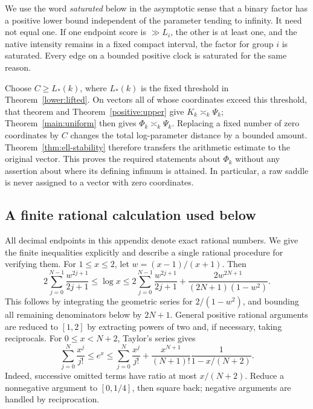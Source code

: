 We use the word \emph{saturated} below in the asymptotic sense that a
binary factor has a positive lower bound independent of the parameter
tending to infinity.  It need not equal one.  If one endpoint score is
\(\gg L_i\), the other is at least one, and the native intensity remains
in a fixed compact interval, the factor for group \(i\) is saturated.
Every edge on a bounded positive clock is saturated for the same reason.

Choose \(C\ge L_*(k)\), where \(L_*(k)\) is the fixed threshold in
Theorem~\ref{lower:lifted}.  On vectors all of whose coordinates exceed
this threshold, that theorem and Theorem~\ref{positive:upper} give
\(K_k\asymp_k\Psi_k\); Theorem~\ref{main:uniform} then gives
\(\Phi_k\asymp_k\Psi_k\).  Replacing a fixed number of zero coordinates
by \(C\) changes the total log-parameter distance by a bounded amount.
Theorem~\ref{thm:ell-stability} therefore transfers the arithmetic
estimate to the original vector.  This proves the required statements
about \(\Phi_k\) without any assertion about where its defining
infimum is attained.  In particular, a raw saddle is never assigned
to a vector with zero coordinates.

\subsection{A finite rational calculation used below}
\label{exapp:certificate-method}

All decimal endpoints in this appendix denote exact rational numbers.
We give the finite inequalities explicitly and describe a single
rational procedure for verifying them.  For \(1\le x\le2\), let
\(w=(x-1)/(x+1)\).  Then
\begin{equation}
 2\sum_{j=0}^{N-1}\frac{w^{2j+1}}{2j+1}
 \le\log x\le
 2\sum_{j=0}^{N-1}\frac{w^{2j+1}}{2j+1}
 +\frac{2w^{2N+1}}{(2N+1)(1-w^2)}.
 \label{exapp:log-bounds}
\end{equation}
This follows by integrating the geometric series for
\(2/(1-w^2)\), and bounding all remaining denominators below by
\(2N+1\).  General positive rational arguments are reduced to
\([1,2]\) by extracting powers of two and, if necessary, taking
reciprocals.  For \(0\le x<N+2\), Taylor's series gives
\begin{equation}
 \sum_{j=0}^N\frac{x^j}{j!}\le e^x\le
 \sum_{j=0}^N\frac{x^j}{j!}
 +\frac{x^{N+1}}{(N+1)!}\frac{1}{1-x/(N+2)}.
 \label{exapp:exp-bounds}
\end{equation}
Indeed, successive omitted terms have ratio at most \(x/(N+2)\).
Reduce a nonnegative argument to \([0,1/4]\), then square back;
negative arguments are handled by reciprocation.

